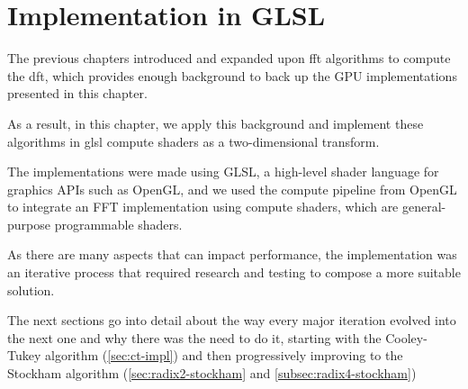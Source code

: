 \documentclass[
  oneside,
  11pt, a4paper,
  footinclude=true,
  headinclude=true,
  cleardoublepage=empty
]{scrbook}
\begin{document}
\chapter{Implementation in GLSL} \label{chap:implementation-in-glsl}

The previous chapters introduced and expanded upon \acrshort{fft} algorithms to compute the \acrshort{dft}, which provides enough background to back up the GPU implementations presented in this chapter.

As a result, in this chapter, we apply this background and implement these algorithms in \acrshort{glsl} compute shaders as a two-dimensional transform. 



The implementations were made using GLSL, a high-level shader language for graphics APIs such as OpenGL, and we used the compute pipeline from OpenGL to integrate an FFT implementation using compute shaders, which are general-purpose programmable shaders.

As there are many aspects that can impact performance, the implementation was an iterative process that required research and testing to compose a more suitable solution.
\newline


The next sections go into detail about the way every major iteration evolved into the next one and why there was the need to do it, starting with the Cooley-Tukey algorithm (\autoref{sec:ct-impl}) and then progressively improving to the Stockham algorithm (\autoref{sec:radix2-stockham} and \autoref{subsec:radix4-stockham})

\end{document}
